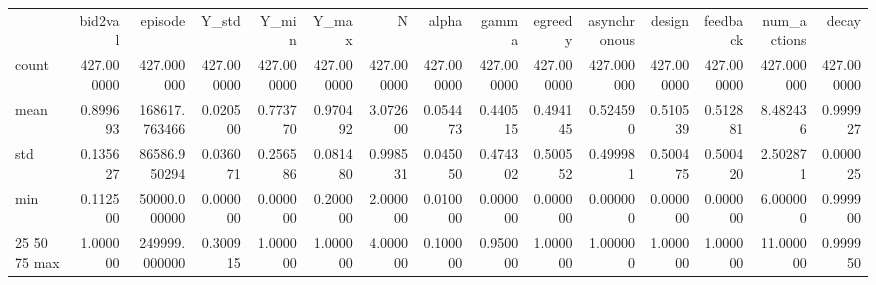 \begin{tabular}{lrrrrrrrrrrrrrr}
 & bid2val & episode & Y_std & Y_min & Y_max & N & alpha & gamma & egreedy & asynchronous & design & feedback & num_actions & decay \\
count & 427.000000 & 427.000000 & 427.000000 & 427.000000 & 427.000000 & 427.000000 & 427.000000 & 427.000000 & 427.000000 & 427.000000 & 427.000000 & 427.000000 & 427.000000 & 427.000000 \\
mean & 0.899693 & 168617.763466 & 0.020500 & 0.773770 & 0.970492 & 3.072600 & 0.054473 & 0.440515 & 0.494145 & 0.524590 & 0.510539 & 0.512881 & 8.482436 & 0.999927 \\
std & 0.135627 & 86586.950294 & 0.036071 & 0.256586 & 0.081480 & 0.998531 & 0.045050 & 0.474302 & 0.500552 & 0.499981 & 0.500475 & 0.500420 & 2.502871 & 0.000025 \\
min & 0.112500 & 50000.000000 & 0.000000 & 0.000000 & 0.200000 & 2.000000 & 0.010000 & 0.000000 & 0.000000 & 0.000000 & 0.000000 & 0.000000 & 6.000000 & 0.999900 \\
25%
50%
75%
max & 1.000000 & 249999.000000 & 0.300915 & 1.000000 & 1.000000 & 4.000000 & 0.100000 & 0.950000 & 1.000000 & 1.000000 & 1.000000 & 1.000000 & 11.000000 & 0.999950 \\
\end{tabular}
